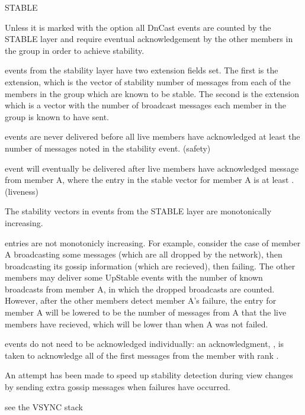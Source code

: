 \begin{Layer}{STABLE}
\begin{Properties}
\item
Unless it is marked with the  option all
DnCast events are counted by the STABLE layer and require eventual
acknowledgement by the other members in the group in order to achieve
stability.
\item
{} events from the stability layer have two extension fields
set.  The first is the  extension, which is the
vector of stability number of messages from each of the members in
the group which are known to be stable.  The second is the
 extension which is a vector with the number of
broadcast messages each member in the group is known to have sent.
\item
{} events are never delivered before all live members have
acknowledged at least the number of messages noted in the stability
event. (safety)
\item
{} event will eventually be delivered after live members have
acknowledged message  from member A, where the entry in
the stable vector for member A is at least . (liveness)
\item
The stability vectors in  events from the STABLE layer are
monotonically increasing.
\end{Properties}

\begin{Notes}
\item
{} entries are not monotonicly increasing.  For example,
consider the case of member A broadcasting some messages (which are
all dropped by the network), then broadcasting its gossip information
(which are recieved), then failing.  The other members may deliver
some UpStable events with the number of known broadcasts from member
A, in which the dropped broadcasts are counted.  However, after the
other members detect member A's failure, the  entry
for member A will be lowered to be the number of messages from A that
the live members have recieved, which will be lower than when A was
not failed.
\item
{} events do not need to be acknowledged individually: an
acknowledgment, , is taken to acknowledge all
of the first  messages from the member with rank
.
\item
An attempt has been made to speed up stability detection during view
changes by sending extra gossip messages when failures have occurred.
\end{Notes}

\begin{Sources}
\end{Sources}

\begin{GenEvent}
\end{GenEvent}

\begin{Testing}
\item see the VSYNC stack
\end{Testing}
\end{Layer}

